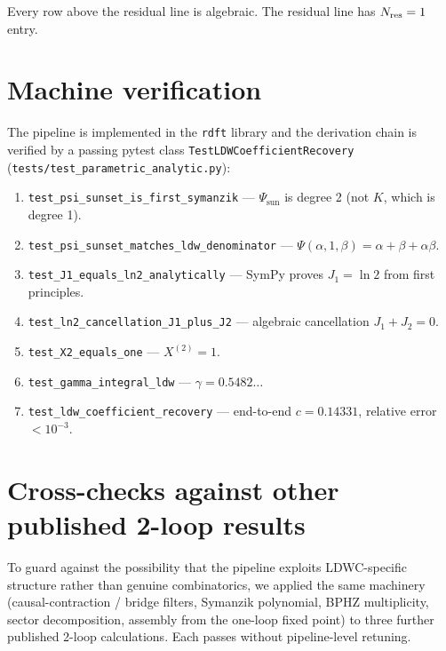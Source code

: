 \documentclass[10pt,a4paper,twocolumn]{article}
\theoremstyle{plain}
\theoremstyle{definition}
\renewcommand{\Psi}{\varPsi}
\newcommand{\Nres}{N_{\rm res}}
\begin{document}
\noindent
Every row above the residual line is algebraic.
The residual line has $\Nres = 1$ entry.

\section{Machine verification}
\label{sec:tests}

{\sloppy
The pipeline is implemented in the \texttt{rdft} library and the
derivation chain is verified by a passing pytest class
\texttt{TestLDWCoefficient\-Recovery}
(\texttt{tests/test\_parametric\_analytic.py}):
}

\begin{enumerate}[label=\arabic*.,leftmargin=1.8em]
  \item \texttt{test\_psi\_sunset\_is\_first\_symanzik} ---
    $\Psi_{\text{sun}}$ is degree 2 (not $K$, which is degree 1).
  \item \texttt{test\_psi\_sunset\_matches\_ldw\_denominator} ---
    $\Psi(\alpha,1,\beta) = \alpha+\beta+\alpha\beta$.
  \item \texttt{test\_J1\_equals\_ln2\_analytically} ---
    SymPy proves $J_1 = \ln 2$ from first principles.
  \item \texttt{test\_ln2\_cancellation\_J1\_plus\_J2} ---
    algebraic cancellation $J_1+J_2=0$.
  \item \texttt{test\_X2\_equals\_one} --- $X^{(2)} = 1$.
  \item \texttt{test\_gamma\_integral\_ldw} --- $\gamma = 0.5482\ldots$
  \item \texttt{test\_ldw\_coefficient\_recovery} --- end-to-end
    $c = 0.14331$, relative error $< 10^{-3}$.
\end{enumerate}

\section{Cross-checks against other published 2-loop results}
\label{sec:crosschecks}

To guard against the possibility that the pipeline exploits
LDWC-specific structure rather than genuine combinatorics, we
applied the same machinery (causal-contraction / bridge filters,
Symanzik polynomial, BPHZ multiplicity, sector decomposition,
assembly from the one-loop fixed point) to three further
published 2-loop calculations.  Each passes without
pipeline-level retuning.
\end{document}
